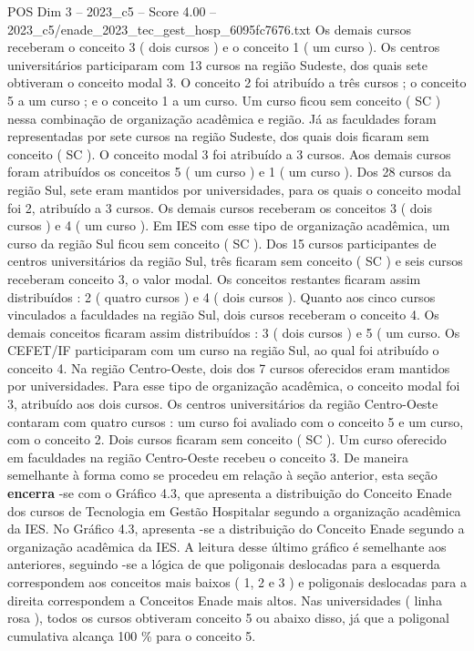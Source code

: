 \begin{textsample}{POS Dim 3 – 2023\_c5 – Score 4.00 – 2023\_c5/enade\_2023\_tec\_gest\_hosp\_6095fc7676.txt}
Os demais cursos receberam o conceito 3 ( dois cursos ) e o conceito 1 ( um curso ).
Os centros universitários participaram com 13 cursos na região Sudeste, dos quais sete obtiveram o conceito modal 3.
O conceito 2 foi atribuído a três cursos ; o conceito 5 a um curso ; e o conceito 1 a um curso.
Um curso ficou sem conceito ( SC ) nessa combinação de organização acadêmica e região.
Já as faculdades foram representadas por sete cursos na região Sudeste, dos quais dois ficaram sem conceito ( SC ).
O conceito modal 3 foi atribuído a 3 cursos.
Aos demais cursos foram atribuídos os conceitos 5 ( um curso ) e 1 ( um curso ).
Dos 28 cursos da região Sul, sete eram mantidos por universidades, para os quais o conceito modal foi 2, atribuído a 3 cursos.
Os demais cursos receberam os conceitos 3 ( dois cursos ) e 4 ( um curso ).
Em IES com esse tipo de organização acadêmica, um curso da região Sul ficou sem conceito ( SC ).
Dos 15 cursos participantes de centros universitários da região Sul, três ficaram sem conceito ( SC ) e seis cursos receberam conceito 3, o valor modal.
Os conceitos restantes ficaram assim distribuídos : 2 ( quatro cursos ) e 4 ( dois cursos ).
Quanto aos cinco cursos vinculados a faculdades na região Sul, dois cursos receberam o conceito 4.
Os demais conceitos ficaram assim distribuídos : 3 ( dois cursos ) e 5 ( um curso.
Os CEFET/IF participaram com um curso na região Sul, ao qual foi atribuído o conceito 4.
Na região Centro-Oeste, dois dos 7 cursos oferecidos eram mantidos por universidades.
Para esse tipo de organização acadêmica, o conceito modal foi 3, atribuído aos dois cursos.
Os centros universitários da região Centro-Oeste contaram com quatro cursos : um curso foi avaliado com o conceito 5 e um curso, com o conceito 2.
Dois cursos ficaram sem conceito ( SC ).
Um curso oferecido em faculdades na região Centro-Oeste recebeu o conceito 3.
De maneira semelhante à forma como se procedeu em relação à seção anterior, esta seção \textbf{encerra} -se com o Gráfico 4.3, que apresenta a distribuição do Conceito Enade dos cursos de Tecnologia em Gestão Hospitalar segundo a organização acadêmica da IES.
No Gráfico 4.3, apresenta -se a distribuição do Conceito Enade segundo a organização acadêmica da IES.
A leitura desse último gráfico é semelhante aos anteriores, seguindo -se a lógica de que poligonais deslocadas para a esquerda correspondem aos conceitos mais baixos ( 1, 2 e 3 ) e poligonais deslocadas para a direita correspondem a Conceitos Enade mais altos.
Nas universidades ( linha rosa ), todos os cursos obtiveram conceito 5 ou abaixo disso, já que a poligonal cumulativa alcança 100 \% para o conceito 5.

\end{textsample}
